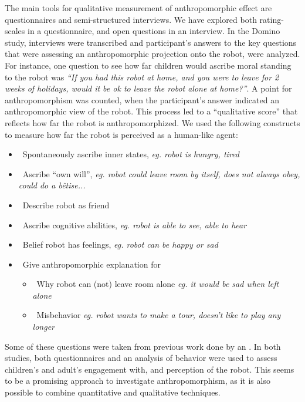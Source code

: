 \documentclass{frontiersSCNS} %
\begin{document}
The main tools for qualitative measurement of anthropomorphic effect are
questionnaires and semi-structured interviews. We have explored both
rating-scales in a questionnaire, and open questions in an interview.  In the
Domino study, interviews were transcribed and participant's answers to the key
questions that were assessing an anthropomorphic projection onto the robot, were
analyzed. For instance, one question to see how far children would ascribe moral
standing to the robot was \emph{``If you had this robot at home, and you were to
leave for 2 weeks of holidays, would it be ok to leave the robot alone at
home?''}. A point for anthropomorphism was counted, when the participant's
answer indicated an anthropomorphic view of the robot. This process led to a
``qualitative score'' that reflects how far the robot is anthropomorphized. We
used the following constructs to measure how far the robot is perceived as a
human-like agent:

\begin{itemize}
    \item ~Spontaneously ascribe inner states, {\it eg. robot is
        hungry, tired}
    \item ~Ascribe ``own will'', {\it eg. robot could leave room by itself, does not
        always obey, could do a b\^{e}tise...}
    \item ~Describe robot as friend
    \item ~Ascribe cognitive abilities, {\it eg. robot is able to see,
        able to hear}
    \item ~Belief robot has feelings, {\it eg. robot can be happy or sad}
    \item ~Give anthropomorphic explanation for
        \begin{itemize}
            \item ~Why robot can (not) leave room alone {\it eg. it would be sad when left alone}
            \item ~Misbehavior {\it eg. robot wants to make a tour, doesn't
                like to play any longer}
        \end{itemize}
\end{itemize}

Some of these questions were taken from previous work done by
\cite{kahn_jr._robotic_2006} an \cite{weiss_i_2009}. In both studies, both
questionnaires and an analysis of behavior were used to assess children's and
adult's engagement with, and perception of the robot. This seems to be a
promising approach to investigate anthropomorphism, as it is also possible to
combine quantitative and qualitative techniques. 
\end{document}
